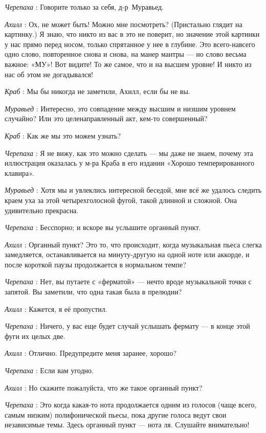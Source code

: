 \documentclass[../main.tex]{subfiles}
\begin{document}
\begin{dialogue}
\emph{Черепаха} : Говорите только за себя, д-р~Муравьед.

\emph{Ахилл} : Ох, не может быть! Можно мне посмотреть? (Пристально глядит на картинку.) Я знаю, что никто из вас в это не поверит, но значение этой картинки у нас прямо перед носом, только спрятанное у нее в глубине. Это всего-навсего одно слово, повторенное снова и снова, на манер мантры --- но слово весьма важное: «МУ»! Вот видите! То же самое, что и на высшем уровне! И никто из нас об этом не догадывался!

\emph{Краб} : Мы бы никогда не заметили, Ахилл, если бы не вы.

\emph{Муравьед} : Интересно, это совпадение между высшим и низшим уровнем случайно? Или это целенаправленный акт, кем-то совершенный?

\emph{Краб} : Как же мы это можем узнать?

\emph{Черепаха} : Я не вижу, как это можно сделать --- мы даже не знаем, почему эта иллюстрация оказалась у м-ра Краба в его издании «Хорошо темперированного клавира».

\emph{Муравьед} : Хотя мы и увлеклись интересной беседой, мне всё же удалось следить краем уха за этой четырехголосной фугой, такой длинной и сложной. Она удивительно прекрасна.

\emph{Черепаха} : Бесспорно; и вскоре вы услышите органный пункт.

\emph{Ахилл} : Органный пункт? Это то, что происходит, когда музыкальная пьеса слегка замедляется, останавливается на минуту-другую на одной ноте или аккорде, и после короткой паузы продолжается в нормальном темпе?

\emph{Черепаха} : Нет, вы путаете с «ферматой» --- нечто вроде музыкальной точки с запятой. Вы заметили, что одна такая была в прелюдии?

\emph{Ахилл} : Кажется, я её пропустил.

\emph{Черепаха} : Ничего, у вас еще будет случай услышать фермату --- в конце этой фуги их целых две.

\emph{Ахилл} : Отлично. Предупредите меня заранее, хорошо?

\emph{Черепаха} : Если вам угодно.

\emph{Ахилл} : Но скажите пожалуйста, что же такое органный пункт?

\emph{Черепаха} : Это когда какая-то нота продолжается одним из голосов (чаще всего, самым низким) полифонической пьесы, пока другие голоса ведут свои независимые темы. Здесь органный пункт --- нота ля. Слушайте внимательно!


\end{dialogue}
\end{document}
